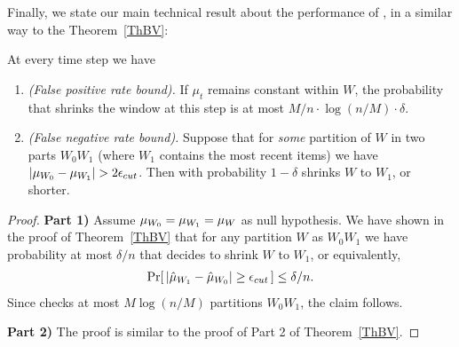 Finally, we state our main technical result about the performance of \adwintwoz, in a similar way to the Theorem~\ref{ThBV}:

\begin{theorem}
\label{ThBV2}
At every time step we have 

\begin{enumerate}
\item {\em (False positive rate bound).} If $\mu_t$ remains constant within $W$, 
the probability that \adwintwo shrinks the window 
at this step is at most $ M/n  \cdot \log (n/M) \cdot \delta$.

\item {\em (False negative rate bound).} 
Suppose that for {\em some} partition of $W$ in two parts $W_0W_1$ 
(where $W_1$ contains the most recent items) 
we have $|\mu_{W_0}-\mu_{W_1}| > 2\epsilon_{cut}$. 
Then with probability $1-\delta$ \adwintwo
shrinks $W$ to $W_1$, or shorter.
\end{enumerate}
\end{theorem}

\begin{proof}

{\bf{Part 1)}}
Assume ${\mu}_{W_0}={\mu}_{W_1}=\mu_W$ as null hypothesis. We have shown in the proof of Theorem~\ref{ThBV} that for any partition
$W$ as $W_0W_1$ we have probability at most $\delta/n$ that \adwinz
decides to shrink $W$ to $W_1$, or equivalently,
\begin{eqnarray*}
\Pr [\, |\hat{\mu}_{W_1} - \hat{\mu}_{W_0}| \ge  \epsilon_{cut}\, ] \le \delta/n.
\end{eqnarray*}
%
Since \adwintwo checks at most  $M \log (n/M)$ partitions $W_0 W_1$, the claim follows.

{\bf{Part 2)}}
The proof is similar to the proof of Part 2 of Theorem~\ref{ThBV}.
\end{proof}
